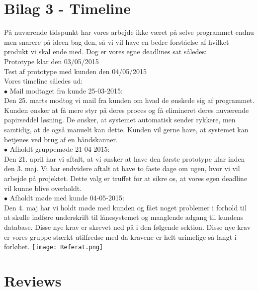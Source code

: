 \documentclass[a4paper]{article}
\begin{document}
\section{Bilag 3 - Timeline}
På nuværende tidspunkt har vores arbejde ikke været på selve programmet endnu men snarere på ideen bag den, så vi vil have en bedre forståelse af hvilket produkt vi skal ende med. Dog er vores egne deadlines sat således:\\
Prototype klar den 03/05/2015 \\
Test af prototype med kunden den 04/05/2015\\
Vores timeline således ud:\\
$\bullet$ Mail modtaget fra kunde 25-03-2015:\\
Den 25. marts modtog vi mail fra kunden om hvad de ønskede sig af programmet. Kunden ønsker at få mere styr på deres proces og få elimineret deres nuværende papirseddel løsning. De ønsker, at systemet automatisk sender rykkere, men samtidig, at de også manuelt kan dette. Kunden vil gerne have, at systemet kan betjenes ved brug af en håndskanner.\\
$\bullet$ Afholdt gruppemøde 21-04-2015:\\
Den 21. april har vi aftalt, at vi ønsker at have den første prototype klar inden den 3. maj. Vi har endvidere aftalt at have to faste dage om ugen, hvor vi vil arbejde på projektet. Dette valg er truffet for at sikre os, at vores egen deadline vil kunne blive overholdt.\\
$\bullet$ Afholdt møde med kunde 04-05-2015:\\
Den 4. maj har vi holdt møde med kunden og fået noget problemer i forhold til at skulle indføre underskrift til lånesystemet og manglende adgang til kundens database. Disse nye krav er skrevet ned på i den følgende sektion. Disse nye krav er vores gruppe stærkt utilfredse med da kravene er helt urimelige så langt i forløbet.
\pagebreak
\texttt{[image: Referat.png]} 
\section{Reviews}
\end{document}
